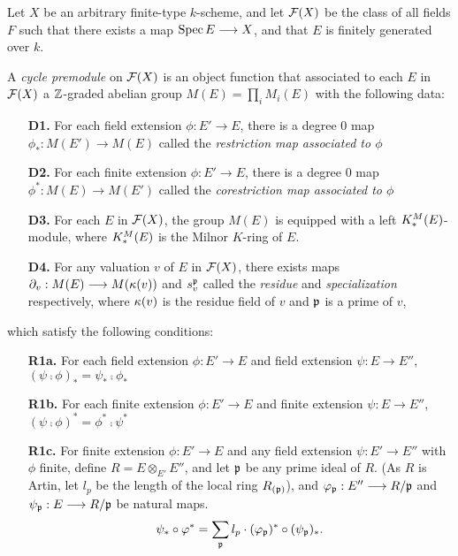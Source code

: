 \begin{defn}\label{def_pre_cycmod}
Let $X$ be an arbitrary finite-type $k$-scheme, and let 
$\mathcal{F}(X)$ be the class of all fields $F$ such that there
exists a map $\mathrm{Spec}\, E \longrightarrow X$, and that $E$ is finitely generated
over $k$.

A \emph{cycle premodule} on $\mathcal{F}(X)$ is an object function
that associated to each $E$ in $\mathcal{F}(X)$ a $\mathbb{Z}$-graded abelian
group $M(E) = \prod_i M_i(E)$ with the following data:

\begin{enumerate}
\item[\textbf{D1.}] For each field extension $\phi: E' \to E$, 
there is a degree 0 map $\phi_*: M(E') \to M(E)$ called the 
\emph{restriction map associated to $\phi$}

\item[\textbf{D2.}] For each finite extension $\phi: E' \to E$, 
there is a degree 0 map $\phi^*: M(E) \to M(E')$ called the 
\emph{corestriction map associated to $\phi$}

\item[\textbf{D3.}] For each $E$ in $\mathcal{F}(X)$, the group $M(E)$ 
is equipped with a left $K^M_*(E)$-module, where $K^M_*(E)$ is 
the Milnor $K$-ring of $E$.

\item[\textbf{D4.}] For any valuation $v$ of $E$ in $\mathcal{F}(X)$, 
there exists maps $\partial_{v}: M(E) \longrightarrow M(\kappa(v))$ and 
$s_{v}^{\mathfrak{p}}$ called the \emph{residue} and 
\emph{specialization} respectively, where $\kappa(v)$ is the 
residue field of $v$ and $\mathfrak{p}$ is a prime of $v$,
\end{enumerate}

which satisfy the following conditions:

\begin{enumerate}
\item[\textbf{R1a.}] For each field extension $\phi: E' \to E$ and 
field extension $\psi: E \to E''$, $(\psi \comp \phi)_* = \psi_* 
\comp \phi_*$

\item[\textbf{R1b.}] For each finite extension $\phi: E' \to E$ and 
finite extension $\psi: E \to E''$, $(\psi \comp \phi)^* = \phi^* 
\comp \psi^*$

\item[\textbf{R1c.}] For finite extension $\phi: E' \to E$ and any 
field extension $\psi: E' \to E''$ with $\phi$ finite, define $R = E 
\otimes_{E'} E''$, and let $\mathfrak{p}$ be any prime ideal of $R$. (As 
$R$ is Artin, let $l_p$ be the length of the local ring 
$R_{(\mathfrak{p})}$), and $\varphi_{\mathfrak{p}}: E'' \longrightarrow R/{\mathfrak{p}}$ 
and $\psi_{\mathfrak{p}}: E \longrightarrow R/{\mathfrak{p}}$ be natural maps.
\[
\psi_*\circ \varphi^* = \sum_{\mathfrak{p}} l_p \cdot 
(\varphi_{\mathfrak{p}})^* \circ (\psi_{\mathfrak{p}})_*.
\]


\end{enumerate}
\end{defn}
